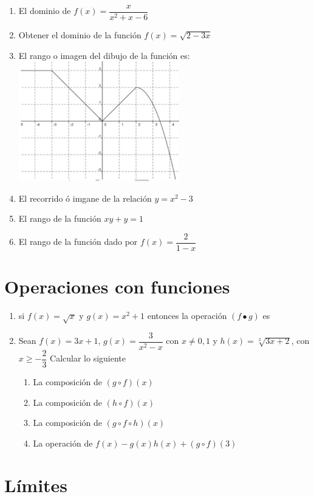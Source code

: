 \documentclass[10pt,a4paper]{article}
\begin{document}
\begin{multicols*}{2}
\begin{enumerate}
            \item El dominio de $f(x) = \dfrac{x}{x^2+x-6}$
            \item Obtener el dominio de la función $f(x) = \sqrt{2-3x}$
            \item El rango o imagen del dibujo de la función es:
            	\includegraphics[width=7cm]{img/s1-87}
            \item El recorrido ó imgane de la relación $y=x^2-3$
            \item El rango de la función $xy+y=1$
            \item El rango de la función dado por $f(x) = \dfrac{2}{1-x}$
        \end{enumerate}
    
    \section{Operaciones con funciones}	
	
        \begin{enumerate}
			\item si $f(x) = \sqrt{x}$ y $g(x) = x^2+1$ entonces la operación $(f \bullet g) $ es
			\item Sean $f(x)=3x+1$, $g(x) = \dfrac{3}{x^2-x}$ con $x \neq 0,1$ y $h(x) = \sqrt[2]{3x+2}$, con $x \geq - \dfrac{2}{3}$ Calcular lo siguiente
			\begin{enumerate}
				\item La composición de $(g \circ f)(x)$
				\item La composición de $(h \circ f)(x)$
				\item La composición de $(g \circ f \circ h)(x)$
				\item La operación de $f(x)-g(x)h(x)+(g \circ f)(3)$
			\end{enumerate}
        \end{enumerate}
    
        \section{Límites}	
	

\end{multicols*}
\end{document}
